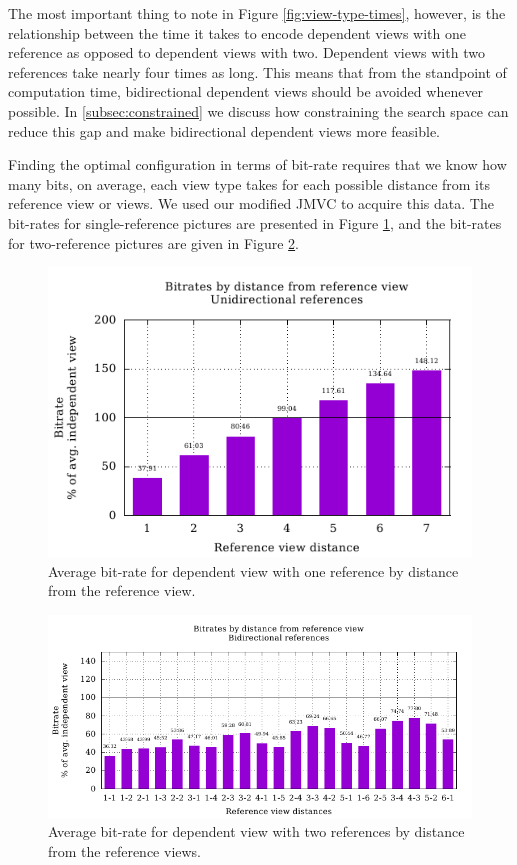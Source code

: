 \documentclass{sig-alternate-05-2015}
\begin{document}
The most important thing to note in Figure \ref{fig:view-type-times}, however,
is the relationship between the time it takes to encode dependent views with one
reference as opposed to dependent views with two. Dependent views with two
references take nearly four times as long. This means that from the standpoint
of computation time, bidirectional dependent views should be avoided whenever
possible. In \ref{subsec:constrained} we discuss how constraining the search
space can reduce this gap and make bidirectional dependent views more feasible.

Finding the optimal configuration in terms of bit-rate requires that we know how
many bits, on average, each view type takes for each possible distance from its
reference view or views. We used our modified JMVC to acquire this data. The
bit-rates for single-reference pictures are presented in Figure
\ref{fig:uniframes}, and the bit-rates for two-reference pictures are given in
Figure \ref{fig:biframes}.

\begin{figure}
\centering
\includegraphics[scale=.68]{figures/motion_vector_data_unconstrained_unidirectional.pdf}
\caption{
Average bit-rate for dependent view with one reference by distance from the
reference view.
}
\label{fig:uniframes}
\end{figure}

\begin{figure}
\centering
\includegraphics[scale=.68]{figures/motion_vector_data_unconstrained_bidirectional.pdf}
\caption{
Average bit-rate for dependent view with two references by distance from the
reference views.
}
\label{fig:biframes}
\end{figure}
\end{document}
